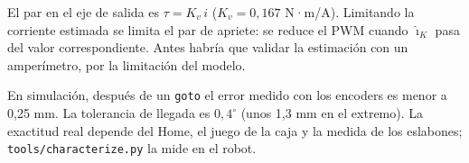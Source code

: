 \documentclass[11pt]{article}
\newcommand{\cod}[1]{\texttt{#1}}
\begin{document}
\begin{preg}
El par en el eje de salida es $\tau=K_v\,i$ ($K_v=0{,}167$ N·m/A). Limitando la corriente estimada se limita el par de apriete: se reduce el PWM cuando $\hat\imath_K$ pasa del valor correspondiente. Antes habría que validar la estimación con un amperímetro, por la limitación del modelo.
\end{preg}

\begin{preg}
En simulación, después de un \cod{goto} el error medido con los encoders es menor a 0,25 mm. La tolerancia de llegada es $0{,}4^\circ$ (unos 1,3 mm en el extremo). La exactitud real depende del Home, el juego de la caja y la medida de los eslabones; \cod{tools/characterize.py} la mide en el robot.
\end{preg}
\end{document}
